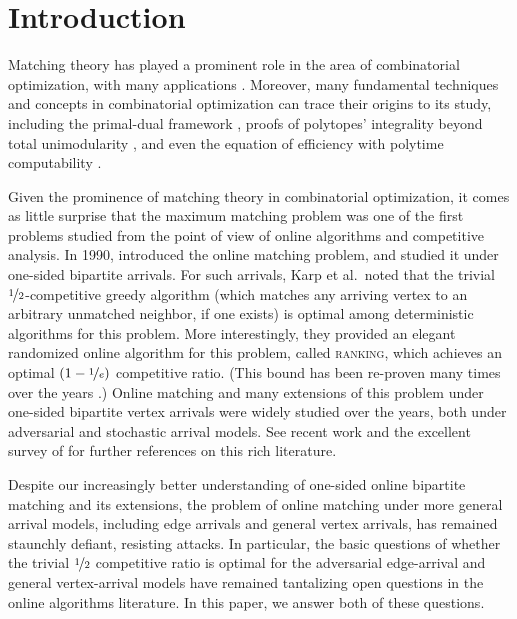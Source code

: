\section{Introduction}\label{sec:intro}
Matching theory has played a prominent role in the area of combinatorial optimization, with many applications \cite{lovasz2009matching,schrijver2003combinatorial}. Moreover, many fundamental techniques and concepts in combinatorial optimization can trace their origins to its study, including the primal-dual framework \cite{kuhn1955hungarian}, proofs of polytopes' integrality beyond total unimodularity \cite{edmonds1965maximum}, and even the equation of efficiency with polytime computability \cite{edmonds1965paths}.

Given the prominence of matching theory in combinatorial optimization, it comes as little surprise that the maximum matching problem was one of the first problems studied from the point of view of online algorithms and competitive analysis. 
In 1990, \citet*{karp1990optimal} introduced the online matching problem, and studied it under one-sided bipartite arrivals. For such arrivals, 
Karp et al.~noted that the trivial $\nicefrac{1}{2}$-competitive greedy algorithm (which matches any arriving vertex to an arbitrary unmatched neighbor, if one exists) is optimal among deterministic algorithms for this problem. 
More interestingly, they provided an elegant randomized online algorithm for this problem, called \textsc{ranking}, which achieves an optimal $(1-\nicefrac{1}{e})$ competitive ratio. (This bound has been re-proven many times over the years \cite{birnbaum2008line,goel2008online,devanur2013randomized,eden2018economic,feige2018tighter}.)
Online matching and many extensions of this problem under one-sided bipartite vertex arrivals were widely studied over the years, both under adversarial and stochastic arrival models.
See recent work \cite{huang2018match,huang2018online,huang2019tight,cohen2018randomized} and the excellent survey of \citet{mehta2013online} for further references on this rich literature.

Despite our increasingly better understanding of one-sided online bipartite matching and its extensions, the problem of online matching under more general arrival models, including edge arrivals and general vertex arrivals, has remained staunchly defiant, resisting attacks. In particular, the basic questions of whether the trivial $\nicefrac{1}{2}$ competitive ratio is optimal for the adversarial edge-arrival and general vertex-arrival models have remained tantalizing open questions in the online algorithms literature. In this paper, we answer both of these questions.

